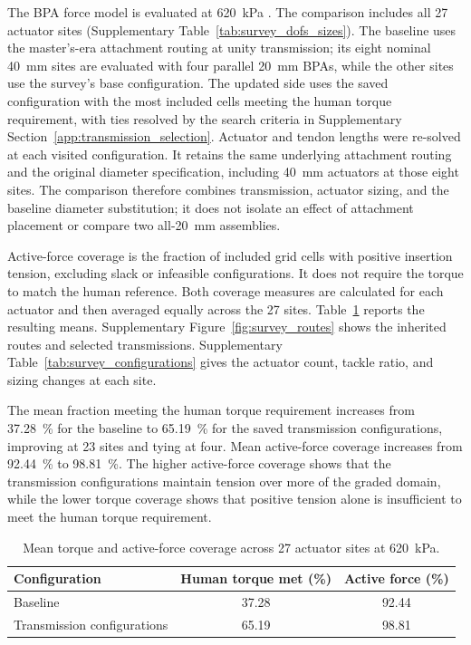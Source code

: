 \documentclass[utf8]{FrontiersinHarvard} %
\begin{document}
The BPA force model is evaluated at \qty{620}{\kPa} \citep{bolen_2026}. The comparison includes all 27 actuator sites (Supplementary Table~\ref{tab:survey_dofs_sizes}). The baseline uses the master's-era attachment routing at unity transmission; its eight nominal \qty{40}{\mm} sites are evaluated with four parallel \qty{20}{\mm} BPAs, while the other sites use the survey's base configuration. The updated side uses the saved configuration with the most included cells meeting the human torque requirement, with ties resolved by the search criteria in Supplementary Section~\ref{app:transmission_selection}. Actuator and tendon lengths were re-solved at each visited configuration. It retains the same underlying attachment routing and the original diameter specification, including \qty{40}{\mm} actuators at those eight sites. The comparison therefore combines transmission, actuator sizing, and the baseline diameter substitution; it does not isolate an effect of attachment placement or compare two all-\qty{20}{\mm} assemblies.

Active-force coverage is the fraction of included grid cells with positive insertion tension, excluding slack or infeasible configurations. It does not require the torque to match the human reference. Both coverage measures are calculated for each actuator and then averaged equally across the 27 sites. Table~\ref{tab:CapabilitySurvey} reports the resulting means. Supplementary Figure~\ref{fig:survey_routes} shows the inherited routes and selected transmissions. Supplementary Table~\ref{tab:survey_configurations} gives the actuator count, tackle ratio, and sizing changes at each site.

The mean fraction meeting the human torque requirement increases from \qty{37.28}{\percent} for the baseline to \qty{65.19}{\percent} for the saved transmission configurations, improving at 23 sites and tying at four. Mean active-force coverage increases from \qty{92.44}{\percent} to \qty{98.81}{\percent}. The higher active-force coverage shows that the transmission configurations maintain tension over more of the graded domain, while the lower torque coverage shows that positive tension alone is insufficient to meet the human torque requirement.

\begin{table}[htbp]
\centering
\begingroup
\fontsize{10pt}{12pt}\selectfont
\caption{Mean torque and active-force coverage across 27 actuator sites at \qty{620}{\kPa}.}
\label{tab:CapabilitySurvey}
\begin{tabular}{@{}lcc@{}}
\toprule
\textbf{Configuration} & \textbf{Human torque met (\%)} & \textbf{Active force (\%)} \\
\midrule
Baseline & 37.28 & 92.44 \\
Transmission configurations & 65.19 & 98.81 \\
\bottomrule
\end{tabular}
\endgroup
\end{table}
\end{document}
